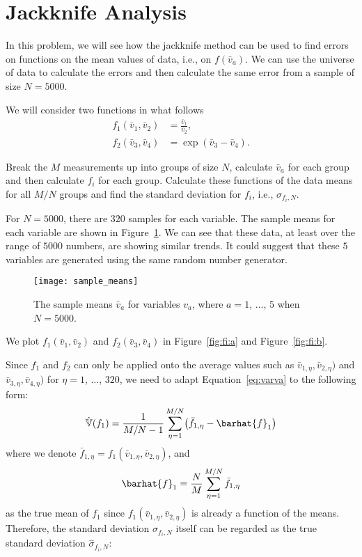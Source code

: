 \section{Jackknife Analysis}

In this problem, we will see how the jackknife method can be used to find errors on functions
on the mean values of data, i.e., on \(f(\bar{v}_a)\).
We can use the universe of data to calculate
the errors and then calculate the same error from a sample of size \(N = 5000\).

We will consider two functions in what follows
%
\begin{align}
    f_1(\bar{v}_1, \bar{v}_2) & = \frac{ \bar{v}_1 }{ \bar{v}_2 }, \\
    f_2(\bar{v}_3, \bar{v}_4) & = \exp( \bar{v}_3 - \bar{v}_4 ).
\end{align}

 Break the \(M\) measurements up into groups of size \(N\), calculate
\(\bar{v}_a\) for each group and then calculate \(f_i\) for each group.
Calculate these functions of the data means for all \(M/N\) groups and find the
standard deviation for \(f_i\), i.e., \(\hat{\sigma}_{f_i,N}\).

\Answer{}
For \(N = 5000\), there are \(320\) samples for each variable.
The sample means for each variable are shown in Figure~\ref{fig:sample_means}.
We can see that these data, at least over the range of \(5000\) numbers,
are showing similar trends.
It could suggest that these \(5\) variables are generated using the same random
number generator.

\begin{figure}[h]
    \centering
    \texttt{[image: sample\_means]}
    \caption{The sample means \(\bar{v}_a\) for variables \(v_a\), where
        \(a = 1\), \(\ldots\), \(5\) when \(N = 5000\).}
    \label{fig:sample_means}
\end{figure}

We plot \(f_1(\bar{v}_1, \bar{v}_2)\) and \(f_2(\bar{v}_3, \bar{v}_4)\) in
Figure~\ref{fig:fi:a} and Figure~\ref{fig:fi:b}.

Since \(f_1\) and \(f_2\) can only be applied onto the average values such as
\(\bar{v}_{1,\eta}, \bar{v}_{2,\eta})\) and \(\bar{v}_{3,\eta}, \bar{v}_{4,\eta})\)
for \(\eta = 1\), \(\ldots\), \(320\), we need to adapt Equation~\eqref{eq:varva}
to the following form:
%
\begin{equation}
    \hat{\mathbb{V}}(f_1) = \frac{ 1 }{ M / N - 1 }
    \sum_{\eta=1}^{M/N} \bigl( \bar{f}_{1,\eta} - \barhat{f}_1 \bigr)
\end{equation}
%
where we denote \(\bar{f}_{1,\eta} = f_1(\bar{v}_{1,\eta}, \bar{v}_{2,\eta})\),
and
%
\begin{equation}
    \barhat{f}_1 = \frac{ N }{ M } \sum_{\eta=1}^{M/N} \bar{f}_{1,\eta}
\end{equation}
as the true mean of \(f_1\)
since \(f_1(\bar{v}_{1,\eta}, \bar{v}_{2,\eta})\) is already a function of the means.
Therefore, the standard deviation \(\sigma_{f_i,N}\) itself can be regarded
as the true standard deviation \(\hat{\sigma}_{f_i,N}\):

